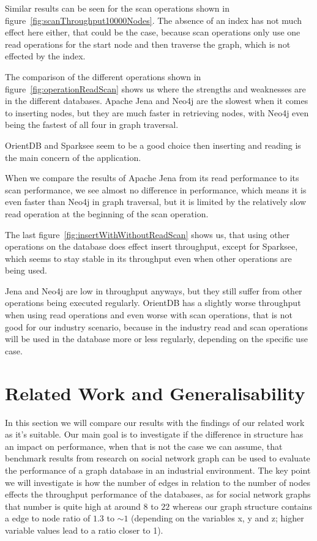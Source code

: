 Similar results can be seen for the scan operations shown in figure~\ref{fig:scanThroughput10000Nodes}.
The absence of an index has not much effect here either,
that could be the case,
because scan operations only use one read operations for the start node and then traverse the graph,
which is not effected by the index.

The comparison of the different operations shown in figure~\ref{fig:operationReadScan} shows us where the strengths and weaknesses are in the different databases.
Apache Jena and Neo4j are the slowest when it comes to inserting nodes,
but they are much faster in retrieving nodes,
with Neo4j even being the fastest of all four in graph traversal.

OrientDB and Sparksee seem to be a good choice then inserting and reading is the main concern of the application.

When we compare the results of Apache Jena from its read performance to its scan performance,
we see almost no difference in performance,
which means it is even faster than Neo4j in graph traversal,
but it is limited by the relatively slow read operation at the beginning of the scan operation.

The last figure~\ref{fig:insertWithWithoutReadScan} shows us,
that using other operations on the database does effect insert throughput,
except for Sparksee,
which seems to stay stable in its throughput even when other operations are being used.

Jena and Neo4j are low in throughput anyways,
but they still suffer from other operations being executed regularly.
OrientDB has a slightly worse throughput when using read operations and even worse with scan operations,
that is not good for our industry scenario,
because in the industry read and scan operations will be used in the database more or less regularly,
depending on the specific use case.

\section{Related Work and Generalisability}
\label{ch:evaluation:se:relatedWorkAndGeneralisability}
In this section we will compare our results with the findings of our related work as it's suitable.
Our main goal is to investigate if the difference in structure has an impact on performance,
when that is not the case we can assume,
that benchmark results from research on social network graph can be used to evaluate the performance of a graph database in an industrial environment.
The key point we will investigate is how the number of edges in relation to the number of nodes effects the throughput performance of the databases,
as for social network graphs that number is quite high at around $ 8 $\cite[41]{TaoShen} to $ 22 $\cite{Dayarathna2012} whereas our graph structure contains a edge to node ratio of $ 1.3 $ to $ \sim1 $ (depending on the variables x, y and z; higher variable values lead to a ratio closer to 1).


